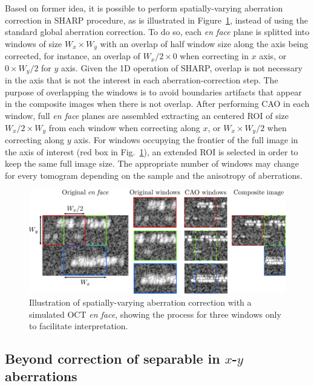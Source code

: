 Based on former idea, it is possible to perform spatially-varying aberration correction in SHARP procedure, as is illustrated in Figure~\ref{fig:spatialAber}, instead of using the standard global aberration correction. To do so, each \textit{en face} plane is splitted into windows of size $W_x\times W_y$ with an overlap of half window size along the axis being corrected, for instance, an overlap of $W_x/2\times 0$ when correcting in $x$ axis, or $0\times W_y/2$ for $y$ axis. Given the 1D operation of SHARP, overlap is not necessary in the axis that is not the interest in each aberration-correction step. The purpose of overlapping the windows is to avoid boundaries artifacts that appear in the composite images when there is not overlap. After performing CAO in each window, full \textit{en face} planes are assembled extracting an centered ROI of size $W_x/2\times W_y$  from each window when correcting along $x$, or $W_x\times W_y/2$ when correcting along $y$ axis. For windows occupying the frontier of the full image in the axis of interest (red box in Fig.~\ref{fig:spatialAber}), an extended ROI is selected in order to keep the same full image size. The appropriate number of windows may change for every tomogram depending on the sample and the anisotropy of aberrations.

\begin{figure}[htb!]
	\centering
	\includegraphics[width=\textwidth]{Figures/SHARP/SpatialVarAber.pdf}
	\caption[Illustration of spatially-varying aberration correction with a simulated OCT \textit{en face}.]{Illustration of spatially-varying aberration correction with a simulated OCT \textit{en face}, showing the process for three windows only to facilitate interpretation.}
	\label{fig:spatialAber}
\end{figure}


\FloatBarrier

\subsection[Beyond correction of separable in \textit{x-y} aberrations]{Beyond correction of separable in $x$-$y$ aberrations}

